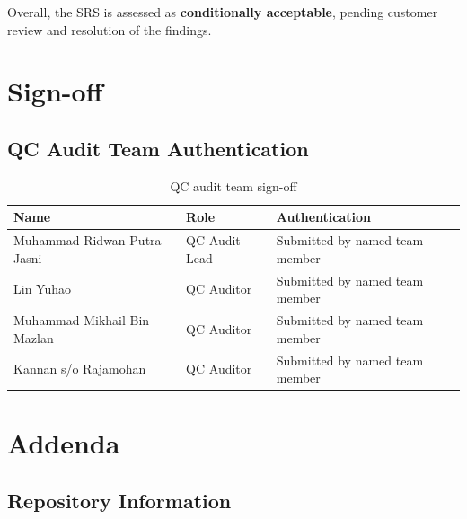 \documentclass[11pt,a4paper]{article}
\begin{document}
Overall, the SRS is assessed as \textbf{conditionally acceptable}, pending customer review and resolution of the findings.

\section{Sign-off}

\subsection{QC Audit Team Authentication}

\begin{table}[H]
\centering
\small
\renewcommand{\arraystretch}{1.6}
\begin{tabular}{|m{}|m{}|m{}|}
\hline
\rowcolor{tableheader}
\textbf{Name} & \textbf{Role} & \textbf{Authentication} \\
\hline
Muhammad Ridwan Putra Jasni & QC Audit Lead & Submitted by named team member \\
\hline
Lin Yuhao & QC Auditor & Submitted by named team member \\
\hline
Muhammad Mikhail Bin Mazlan & QC Auditor & Submitted by named team member \\
\hline
Kannan s/o Rajamohan & QC Auditor & Submitted by named team member \\
\hline
\end{tabular}
\caption{QC audit team sign-off}
\label{tab:qc-signoff}
\end{table}

\section{Addenda}

\subsection{Repository Information}

\begin{center}
\end{center}
\end{document}
